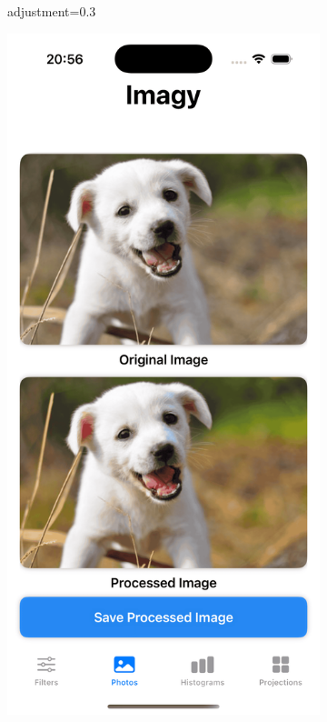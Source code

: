 \documentclass[a4paper]{article}
\begin{document}
\begin{figure}[H]
\begin{subfigure}{0.2\textwidth}
        \caption{adjustment=0.3}
        \label{fig:dog_saturation_0}
    \end{subfigure}
    \hfill
    \begin{subfigure}{0.2\textwidth}
        \centering
        \includegraphics[width=\linewidth]{images/dog_saturation_1.7.png}

\end{subfigure}
\end{figure}
\end{document}
